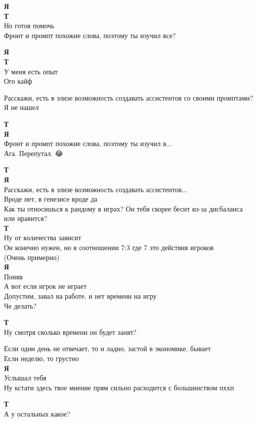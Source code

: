 \begin{tabbing}
\textbf{Я} \\
\textbf{Т} \\
Но готов помочь \\
Фронт и промпт похожие слова, поэтому ты изучил все?

\textbf{Я} \\
\textbf{Т} \\
У меня есть опыт \\
Ого кайф

Расскажи, есть в элизе возможность создавать ассистентов со своими промптами? Я не нашел

\textbf{Т} \\
\textbf{Я} \\
Фронт и промпт похожие слова, поэтому ты изучил в... \\
Ага. Перепутал. 😂🎅

\textbf{Т} \\
\textbf{Я} \\
Расскажи, есть в элизе возможность создавать ассистентов...\\

Вроде нет, в генезисе вроде да\\
Как ты относишься к рандому в играх? Он тебя скорее бесит из-за дисбаланса или нравится?\\

\textbf{Т} \\
Ну от количества зависит \\
Он конечно нужен, но в соотношении 7:3 где 7 это действия игроков \\
(Очень примерно)\\
\textbf{Я} \\
Поняв \\
А вот если игрок не играет \\
Допустим, завал на работе, и нет времени на игру \\
Че делать?

\textbf{Т} \\
Ну смотря сколько времени он будет занят?

Если один день не отвечает, то и ладно, застой в экономике, бывает\\

Если неделю, то грустно\\
\textbf{Я} \\
Услышал тебя \\
Ну кстати здесь твое мнение прям сильно расходится с большинством пххп

\textbf{Т} \\
А у остальных какое?


\end{tabbing}
